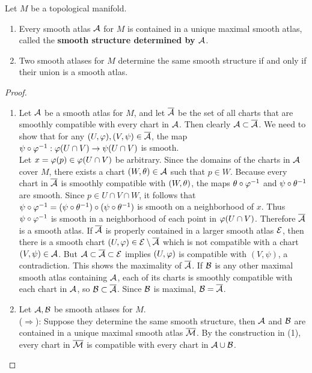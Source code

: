 \begin{proposition}
    Let $M$ be a topological manifold.
    \begin{enumerate}
    \item Every smooth atlas $\mathcal{A}$ for $M$ is contained in a unique maximal smooth atlas, called the \textbf{smooth structure determined by $\mathcal{A}$}.
    \item Two smooth atlases for $M$ determine the same smooth structure if and only if their union is a smooth atlas. 
    \end{enumerate}
\end{proposition}
\begin{proof}
\begin{enumerate}
    \item Let $\mathcal{A}$ be a smooth atlas for $M$, and let $\overline{\mathcal{A}}$ be the set of all charts that are smoothly compatible with every chart in $\mathcal{A}$. Then clearly $\mathcal{A} \subset \overline{\mathcal{A}}$. 
    We need to show that for any $(U,\varphi), (V,\psi) \in \overline{\mathcal{A}}$, the map $\psi \circ \varphi^{-1}: \varphi(U \cap V) \to \psi(U \cap V)$ is smooth. \\
    Let $x = \varphi(p) \in \varphi(U \cap V)$ be arbitrary. Since the domains of the charts in $\mathcal{A}$ cover $M$, there exists a chart $(W, \theta) \in \mathcal{A}$ such that $p \in W$. Because every chart in $\overline{\mathcal{A}}$ is smoothly compatible with $(W, \theta)$, the maps $\theta \circ \varphi^{-1}$ and $\psi \circ \theta^{-1}$ are smooth. Since $p \in U \cap V \cap W$, it follows that $\psi \circ \varphi^{-1} = (\psi \circ \theta^{-1}) \circ (\psi \circ \theta^{-1})$ is smooth on a neighborhood of $x$. Thus $\psi \circ \varphi^{-1}$ is smooth in a neighborhood of each point in $\varphi(U \cap V)$. Therefore $\overline{\mathcal{A}}$ is a smooth atlas. If $\overline{\mathcal{A}}$ is properly contained in a larger smooth atlas $\mathcal{E}$, then there is a smooth chart $(U, \varphi) \in \mathcal{E} \setminus \overline{\mathcal{A}}$ which is not compatible with a chart $(V,\psi) \in \mathcal{A}$. But $\mathcal{A} \subset \overline{\mathcal{A}} \subset \mathcal{E}$ implies $(U, \varphi)$ is compatible with $(V,\psi)$, a contradiction. This shows the maximality of $\overline{\mathcal{A}}$. 
    If $\mathcal{B}$ is any other maximal smooth atlas containing $\mathcal{A}$, each of its charts is smoothly compatible with each chart in $\mathcal{A}$, so $\mathcal{B} \subset \overline{\mathcal{A}}$. Since $\mathcal{B}$ is maximal, $\mathcal{B} = \overline{\mathcal{A}}$. 
    \item Let $\mathcal{A}, \mathcal{B}$ be smooth atlases for $M$. \\
    ($\Longrightarrow$): Suppose they determine the same smooth structure, then $\mathcal{A}$ and $\mathcal{B}$ are contained in a unique maximal smooth atlas $\overline{\mathcal{M}}$.
    By the construction in (1), every chart in $\overline{\mathcal{M}}$ is compatible with every chart in $\mathcal{A} \cup \mathcal{B}$. 
    

\end{enumerate}
\end{proof}
